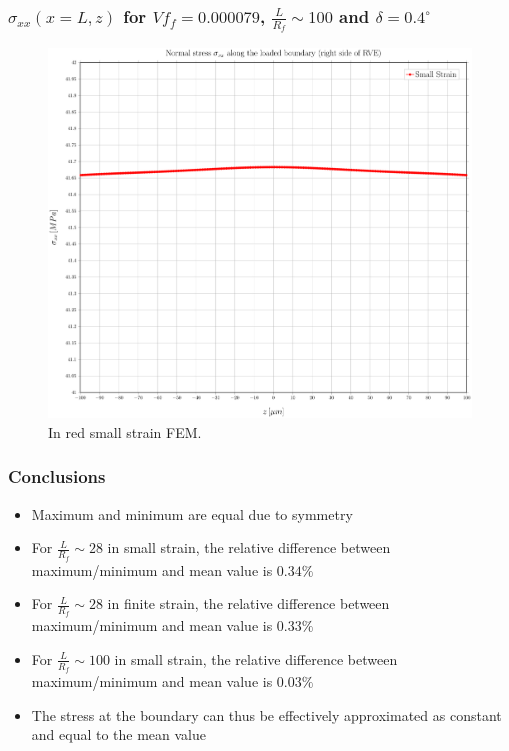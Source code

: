 \documentclass[first,firstsupp,lastsupp,handout,last,hyperref,table]{ETHclass}
\begin{document}
\begin{frame}
\frametitle{\small $\sigma_{xx}\left(x=L,z\right)$ for $Vf_{f}=0.000079$, $\frac{L}{R_{f}}\sim100$ and $\delta=0.4^{\circ}$}
\vspace{-0.5cm}
\centering
\captionsetup[figure]{font=scriptsize,labelfont=scriptsize}
\begin{figure}[!h]
\centering
\includegraphics[height=0.7\textheight]{2017-06-16_AbqRunSummary_SingleFiberEqRfSmallStrain-D0-4_sigmaatboundary_Summary.pdf}
  \caption{\scriptsize In red small strain FEM.}
  \label{fig:res1}
\end{figure}
\end{frame}

\begin{frame}
\frametitle{\small Conclusions}
\vspace{-0.5cm}
\centering
\begin{itemize}[label=]
\item Maximum and minimum are equal due to symmetry
\item For $\frac{L}{R_{f}}\sim 28$ in small strain, the relative difference between maximum/minimum and mean value is $0.34\%$
\item For $\frac{L}{R_{f}}\sim 28$ in finite strain, the relative difference between maximum/minimum and mean value is $0.33\%$ 
\item For $\frac{L}{R_{f}}\sim 100$ in small strain, the relative difference between maximum/minimum and mean value is $0.03\%$ 
\item The stress at the boundary can thus be effectively approximated as constant and equal to the mean value
\end{itemize}
\end{frame}
\end{document}
